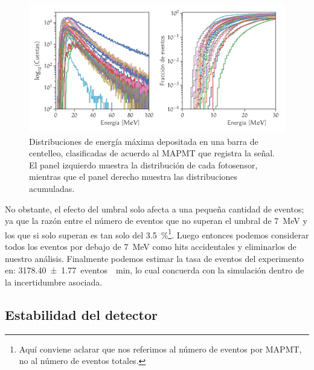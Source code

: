 \begin{figure}
        \centering
        \includegraphics[width=\textwidth]{scibar-threshold.pdf}
        \caption{Distribuciones de energía máxima depositada en una barra de centelleo, clasificadas de acuerdo al MAPMT que registra la señal. El panel izquierdo muestra la distribución de cada fotosensor, mientras que el panel derecho muestra las distribuciones acumuladas.}
        \label{fig:scibar-threshold}
\end{figure}

No obstante, el efecto del umbral solo afecta a una pequeña cantidad de eventos; ya que la razón entre el número de eventos que no superan el umbral de \SI{7}{\mega\electronvolt} y los que si solo superan es tan solo del \SI{3.5}{\percent}\footnote{Aquí conviene aclarar que nos referimos al número de eventos por MAPMT, no al número de eventos totales.}. Luego entonces podemos considerar todos los eventos por debajo de \SI{7}{\mega\electronvolt} como hits accidentales y eliminarlos de nuestro análisis. Finalmente podemos estimar la tasa de eventos del experimento en: \SI{3178.40(177)}{eventos \per\minute}, lo cual concuerda con la simulación dentro de la incertidumbre asociada.

\subsection{Estabilidad del detector}

